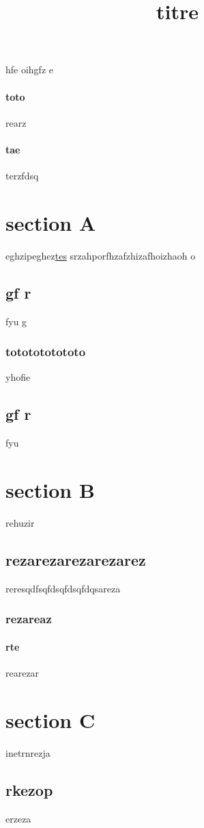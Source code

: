 \documentclass{article}
\title{titre}
\begin{document}
\maketitle
hfe oihgfz e
\paragraph{toto}{rearz}
\paragraph{tae}{terzfdsq}
\section{section A}{eghzipeghez\underline{\color{red}tes}
srzahporfhzafzhizafhoizhaoh o\subsection{gf r}{fyu g\subsubsection{tototototototo}{yhofie}
} \subsection{gf r}{fyu}}

\section{section B}{rehuzir\subsection{rezarezarezarezarez}{reresqdfsqfds\color{red}qfdsqfdqsareza\subsubsection{rezareaz}{\paragraph{rte}{rearezar}}}}

\section{section C}{inetrnrezja\subsection{rkezop}{erzeza}}
\end{document}
